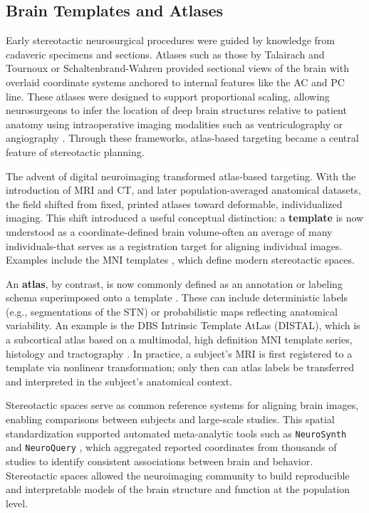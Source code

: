 \subsection{Brain Templates and Atlases}
\label{sec:template_atlas}
Early stereotactic neurosurgical procedures were guided by knowledge from cadaveric specimens and sections. Atlases such as those by Talairach and Tournoux \cite{Talairach1957-eb,Talairach1988-wk} or Schaltenbrand-Wahren \cite{Schaltenbrand1977-ge} provided sectional views of the brain with overlaid coordinate systems anchored to internal features like the AC and PC line. These atlases were designed to support proportional scaling, allowing neurosurgeons to infer the location of deep brain structures relative to patient anatomy using intraoperative imaging modalities such as ventriculography or angiography \cite{Conti2023-oo}. Through these frameworks, atlas-based targeting became a central feature of stereotactic planning.

The advent of digital neuroimaging transformed atlas-based targeting. With the introduction of MRI and CT, and later population-averaged anatomical datasets, the field shifted from fixed, printed atlases toward deformable, individualized imaging. This shift introduced a useful conceptual distinction: a \textbf{template} is now understood as a coordinate-defined brain volume-often an average of many individuals-that serves as a registration target for aligning individual images. Examples include the MNI templates \cite{Avants2008-ek,Fonov2009-oi}, which define modern stereotactic spaces.

An \textbf{atlas}, by contrast, is now commonly defined as an annotation or labeling schema superimposed onto a template \cite{Chakravarty2006-ln}. These can include deterministic labels (e.g., segmentations of the STN) or probabilistic maps reflecting anatomical variability. An example is the DBS Intrinsic Template AtLas (DISTAL), which is a subcortical atlas based on a multimodal, high definition MNI template series, histology and tractography \cite{Ewert2018-bn}. In practice, a subject's MRI is first registered to a template via nonlinear transformation; only then can atlas labels be transferred and interpreted in the subject's anatomical context.

Stereotactic spaces serve as common reference systems for aligning brain images, enabling comparisons between subjects and large-scale studies. This spatial standardization supported automated meta-analytic tools such as \texttt{NeuroSynth} \cite{Yarkoni2011-sr} and \texttt{NeuroQuery} \cite{Dockes2020-nw}, which aggregated reported coordinates from thousands of studies to identify consistent associations between brain and behavior. Stereotactic spaces allowed the neuroimaging community to build reproducible and interpretable models of the brain structure and function at the population level.

